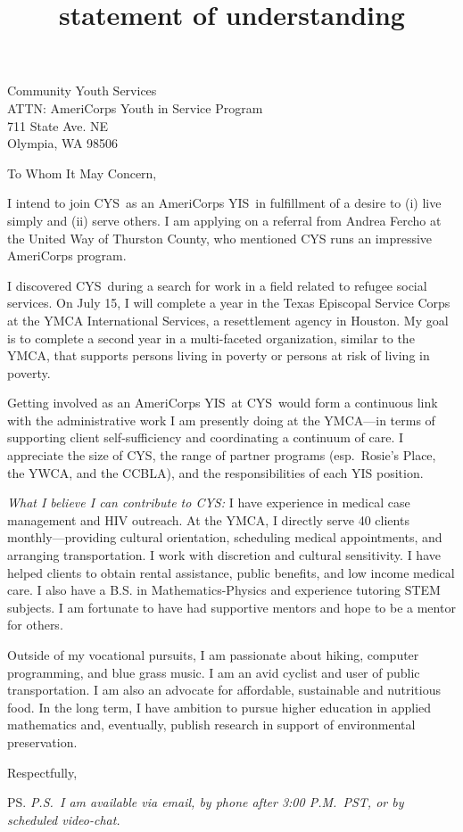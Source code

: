 \documentclass{letter}
\title{statement of understanding}
\newcommand{\jobtitle}{an AmeriCorps YIS}
\newcommand{\company}{CYS}
\begin{document}
\begin{letter}{Community Youth Services \\ 
ATTN: AmeriCorps Youth in Service Program \\
711 State Ave. NE \\
Olympia, WA 98506}
\opening{To Whom It May Concern,}

I intend to join \company\ as \jobtitle\ in fulfillment of a desire to (i) live simply and (ii) serve others. I am applying on a referral from Andrea Fercho at the United Way of Thurston County, who mentioned CYS runs an impressive AmeriCorps program.

I discovered \company\ during a search for work in a field related to refugee social services. On July 15, I will complete a year in the Texas Episcopal Service Corps at the YMCA International Services, a resettlement agency in Houston. My goal is to complete a second year in a multi-faceted organization, similar to the YMCA, that supports persons living in poverty or persons at risk of living in poverty.

Getting involved as \jobtitle\ at \company\ would form a continuous link with the administrative work I am presently doing at the YMCA---in terms of supporting client self-sufficiency and coordinating a continuum of care. I appreciate the size of CYS, the range of partner programs (esp.\ Rosie's Place, the YWCA, and the CCBLA), and the responsibilities of each YIS position.

\emph{What I believe I can contribute to CYS:} I have experience in medical case management and HIV outreach. At the YMCA, I directly serve 40 clients monthly---providing cultural orientation, scheduling medical appointments, and arranging transportation. I work with discretion and cultural sensitivity. I have helped clients to obtain rental assistance, public benefits, and low income medical care. I also have a B.S. in Mathematics-Physics and experience tutoring STEM subjects. I am fortunate to have had supportive mentors and hope to be a mentor for others. 

Outside of my vocational pursuits, I am passionate about hiking, computer programming, and blue grass music. I am an avid cyclist and user of public transportation. I am also an advocate for affordable, sustainable and nutritious food. In the long term, I have ambition to pursue higher education in applied mathematics and, eventually, publish research in support of environmental preservation.

\closing{Respectfully,}
\ps
\emph{P.S.\ I am available via email, by phone after 3:00 P.M.\ PST, or by scheduled video-chat.}

\end{letter}
\end{document}
